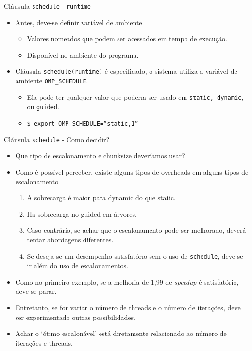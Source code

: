 	\begin{frame}{Cláusula {\tt schedule} - {\tt runtime}}
		\begin{itemize}
			\setlength\itemsep{1.5em}
			\item Antes, deve-se definir variável de ambiente 
			\begin{itemize}
				\setlength\itemsep{0.8em}
				\item Valores nomeados que podem ser acessados em tempo de execução. 
				\item Disponível no ambiente do programa.
			\end{itemize}
			\item Cláusula {\tt schedule(runtime)} é especificado, o sistema utiliza a variável de ambiente {\tt OMP\_SCHEDULE}.
			\begin{itemize}
				\setlength\itemsep{0.8em}
				\item Ela pode ter qualquer valor que poderia ser usado em {\tt static, dynamic}, ou {\tt guided}.
				\item {\tt \$ export OMP\_SCHEDULE=``static,1''}
			\end{itemize}
		\end{itemize}
	\end{frame}

	\begin{frame}{Cláusula {\tt schedule} - Como decidir?}
		\begin{itemize}
			\item Que tipo de escalonamento e chunksize deveríamos usar?
					\bigskip
			\item Como é possível perceber, existe alguns tipos de overheads em alguns tipos de escalonamento
			\begin{enumerate}
				\item A sobrecarga é maior para dynamic do que static.
				\item Há sobrecarga no guided em árvores.
				\item Caso contrário, se achar que o escalonamento pode ser melhorado, deverá tentar abordagens diferentes.
				\item Se deseja-se um desempenho satisfatório sem o uso de {\tt schedule}, deve-se ir além do uso de escalonamentos.
			\end{enumerate}
						\bigskip
			\item Como no primeiro exemplo, se a melhoria de 1,99 de \textit{speedup} é satisfatório, deve-se parar.
			\item Entretanto, se for variar o número de threads e o número de iterações, deve ser experimentado outras possibilidades. 
			\item Achar o `ótimo escalonável' está diretamente relacionado ao número de iterações e threads.
		\end{itemize}
	\end{frame}


